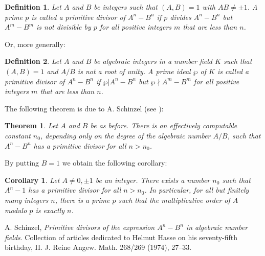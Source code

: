 \documentclass[12pt]{article}
\newtheorem*{thm}{Theorem}
\newtheorem{defn}{Definition}
\newtheorem*{cor}{Corollary}
\theoremstyle{definition}
\begin{document}
\begin{defn}
Let $A$ and $B$ be integers such that $(A,B)=1$ with $AB\neq \pm 1$. A prime $p$ is called a \emph{primitive divisor} of $A^n-B^n$ if $p$ divides $A^n-B^n$ but $A^m-B^m$ is not divisible by $p$ for all positive integers $m$ that are less than $n$.
\end{defn}

Or, more generally:

\begin{defn}
Let $A$ and $B$ be algebraic integers in a number field $K$ such that $(A,B)=1$ and $A/B$ is not a root of unity. A prime ideal $\wp$ of $K$ is called a \emph{primitive divisor} of $A^n-B^n$ if $\wp|A^n-B^n$ but $\wp \nmid A^m-B^m$ for all positive integers $m$ that are less than $n$.
\end{defn}

The following theorem is due to A. Schinzel (see \cite{sch}):

\begin{thm}
Let $A$ and $B$ be as before. There is an effectively computable constant $n_0$, depending only on the degree of the algebraic number $A/B$, such that $A^n-B^n$ has a primitive divisor for all $n>n_0$.
\end{thm}

By putting $B=1$ we obtain the following corollary:

\begin{cor}
Let $A\neq 0,\pm 1$ be an integer. There exists a number $n_0$ such that $A^n-1$ has a primitive divisor for all $n>n_0$. In particular, for all but finitely many integers $n$, there is a prime $p$ such that the multiplicative order of $A$ modulo $p$ is exactly $n$.
\end{cor}

\begin{thebibliography}{8}
 A. Schinzel, {\em Primitive divisors of the expression $A^n-B^n$ in algebraic number fields}.
Collection of articles dedicated to Helmut Hasse on his seventy-fifth birthday, II. J. Reine Angew. Math. 268/269 (1974), 27--33.
\end{thebibliography}
\end{document}
